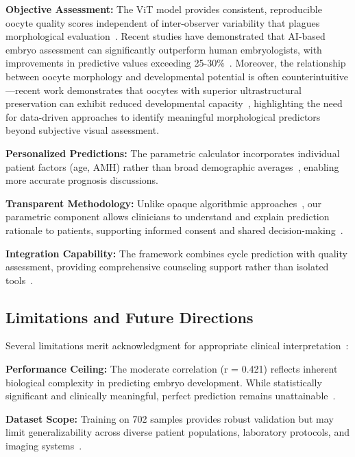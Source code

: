 \documentclass[pdflatex,sn-basic]{sn-jnl}%
\begin{document}
\textbf{Objective Assessment:} The ViT model provides consistent, reproducible oocyte quality scores independent of inter-observer variability that plagues morphological evaluation~\cite{paternot2009observer,paternot2011multicentre}. Recent studies have demonstrated that AI-based embryo assessment can significantly outperform human embryologists, with improvements in predictive values exceeding 25-30\%~\cite{silver2020datadriven}. Moreover, the relationship between oocyte morphology and developmental potential is often counterintuitive—recent work demonstrates that oocytes with superior ultrastructural preservation can exhibit reduced developmental capacity~\cite{reader2022high}, highlighting the need for data-driven approaches to identify meaningful morphological predictors beyond subjective visual assessment.

\textbf{Personalized Predictions:} The parametric calculator incorporates individual patient factors (age, AMH) rather than broad demographic averages~\cite{gameiro2023understanding}, enabling more accurate prognosis discussions.

\textbf{Transparent Methodology:} Unlike opaque algorithmic approaches~\cite{rudin2019stop}, our parametric component allows clinicians to understand and explain prediction rationale to patients, supporting informed consent and shared decision-making~\cite{beauchamp2019principles}.

\textbf{Integration Capability:} The framework combines cycle prediction with quality assessment, providing comprehensive counseling support rather than isolated tools~\cite{asrm2021counselors}.

\subsection{Limitations and Future Directions}

Several limitations merit acknowledgment for appropriate clinical interpretation~\cite{varoquaux2022machine}:

\textbf{Performance Ceiling:} The moderate correlation (r = 0.421) reflects inherent biological complexity in predicting embryo development. While statistically significant and clinically meaningful, perfect prediction remains unattainable~\cite{rajkomar2019machine}.

\textbf{Dataset Scope:} Training on 702 samples provides robust validation but may limit generalizability across diverse patient populations, laboratory protocols, and imaging systems~\cite{litjens2017survey}.
\end{document}
